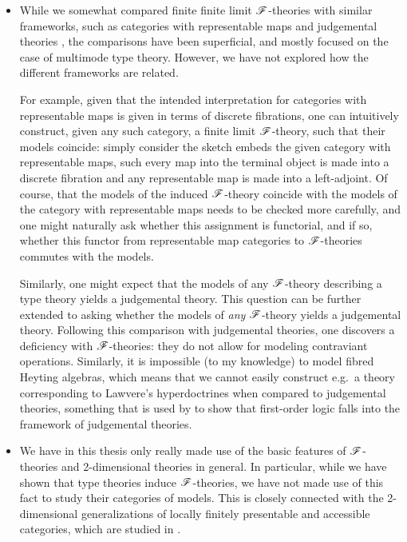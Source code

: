 \documentclass[../thesis.tex]{subfiles}
\begin{document}
\begin{itemize}
  \item  While we somewhat compared finite finite limit ${\mathscr{F}}$-theories with similar frameworks, such as categories with
    representable maps \cite{uemura2023} and judgemental theories \cite{coraglia2024a}, the comparisons have been superficial,
    and mostly focused on the case of multimode type theory. However, we have not explored how the different frameworks are
    related.

    For example, given that the intended interpretation for categories with representable maps is given in terms of discrete
    fibrations, one can intuitively construct, given any such category, a finite limit ${\mathscr{F}}$-theory, such that their models
    coincide: simply consider the sketch embeds the given category with representable maps, such every map into the terminal
    object is made into a discrete fibration and any representable map is made into a left-adjoint. Of course, that the models
    of the induced ${\mathscr{F}}$-theory coincide with the models of the category with representable maps needs to be checked more
    carefully, and one might naturally ask whether this assignment is functorial, and if so, whether this functor from
    representable map categories to ${\mathscr{F}}$-theories commutes with the models.

    Similarly, one might expect that the models of any ${\mathscr{F}}$-theory describing a type theory yields a judgemental theory.
    This question can be further extended to asking whether the models of \emph{any} ${\mathscr{F}}$-theory yields a judgemental theory.
    Following this comparison with judgemental theories, one discovers a deficiency with ${\mathscr{F}}$-theories: they do not allow for
    modeling contraviant operations. Similarly, it is impossible (to my knowledge) to model fibred Heyting algebras, which means
    that we cannot easily construct e.g.\ a theory corresponding to Lawvere's hyperdoctrines when compared to judgemental theories,
    something that is used by \cite[§4]{coraglia2024a} to show that first-order logic falls into the framework of judgemental
    theories.

  \item We have in this thesis only really made use of the basic features of ${\mathscr{F}}$-theories and 2-dimensional theories in
    general. In particular, while we have shown that type theories induce ${\mathscr{F}}$-theories, we have not made use of this fact
    to study their categories of models. This is closely connected with the 2-dimensional generalizations of locally finitely
    presentable and accessible categories, which are studied in \cite{bourke2021, diliberti2024}. 


\end{itemize}
\end{document}
